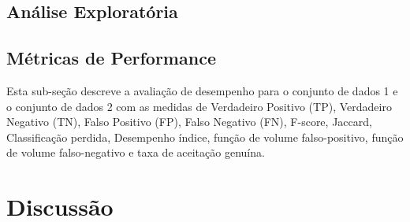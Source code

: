 \documentclass[article,11pt,a4paper,brazil]{abntex2}
\begin{document}
	\subsection{Análise Exploratória}
	
	
	
	\subsection{Métricas de Performance}
	Esta sub-seção descreve a avaliação de desempenho para o conjunto de dados 1 e o conjunto de dados 2 com as medidas de Verdadeiro Positivo (TP), Verdadeiro Negativo (TN), Falso Positivo (FP), Falso Negativo (FN), F-score, Jaccard, Classificação perdida, Desempenho índice, função de volume falso-positivo, função de volume falso-negativo e taxa de aceitação genuína.
	
	
	\section{Discussão}
	\lipsum[2]
	
	
	
	\newpage
	
	

	
\end{document}
